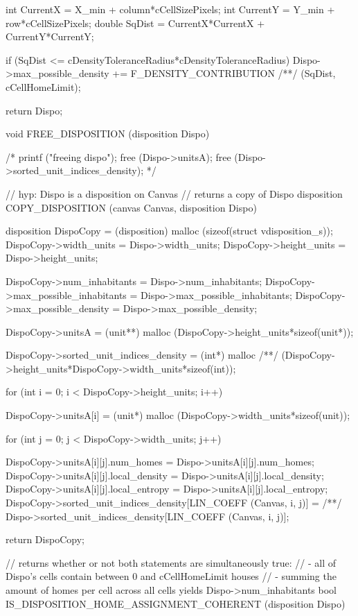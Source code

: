 \begin{C}
{{{			int CurrentX = X_min + column*cCellSizePixels;
			int CurrentY = Y_min + row*cCellSizePixels;
			double SqDist = CurrentX*CurrentX + CurrentY*CurrentY;
			
			if (SqDist <= cDensityToleranceRadius*cDensityToleranceRadius){
				Dispo->max_possible_density += F_DENSITY_CONTRIBUTION
				/**/ (SqDist, cCellHomeLimit);
			}
		}
	}
	return Dispo;
}



void FREE_DISPOSITION (disposition Dispo){
	
	/* printf ("freeing dispo\n");
	free (Dispo->unitsA);
	free (Dispo->sorted_unit_indices_density); */
}


// hyp: Dispo is a disposition on Canvas
// returns a copy of Dispo
disposition COPY_DISPOSITION (canvas Canvas, disposition Dispo){
	
	disposition DispoCopy = (disposition) malloc (sizeof(struct vdisposition_s));
	DispoCopy->width_units = Dispo->width_units;
	DispoCopy->height_units = Dispo->height_units;
	
	DispoCopy->num_inhabitants = Dispo->num_inhabitants;
	DispoCopy->max_possible_inhabitants = Dispo->max_possible_inhabitants;
	DispoCopy->max_possible_density = Dispo->max_possible_density;
	
	DispoCopy->unitsA = (unit**) malloc (DispoCopy->height_units*sizeof(unit*));
	
	DispoCopy->sorted_unit_indices_density = (int*) malloc
	/**/ (DispoCopy->height_units*DispoCopy->width_units*sizeof(int));
	
	for (int i = 0; i < DispoCopy->height_units; i++){
		
		DispoCopy->unitsA[i] = (unit*) malloc (DispoCopy->width_units*sizeof(unit));
		
		for (int j = 0; j < DispoCopy->width_units; j++){
			
			DispoCopy->unitsA[i][j].num_homes = Dispo->unitsA[i][j].num_homes;
			DispoCopy->unitsA[i][j].local_density = Dispo->unitsA[i][j].local_density;
			DispoCopy->unitsA[i][j].local_entropy = Dispo->unitsA[i][j].local_entropy;
			DispoCopy->sorted_unit_indices_density[LIN_COEFF (Canvas, i, j)] =
			/**/ Dispo->sorted_unit_indices_density[LIN_COEFF (Canvas, i, j)];
		}
	}
	return DispoCopy;
}


// returns whether or not both statements are simultaneously true:
// - all of Dispo's cells contain between 0 and cCellHomeLimit houses
// - summing the amount of homes per cell across all cells yields Dispo->num_inhabitants
bool IS_DISPOSITION_HOME_ASSIGNMENT_COHERENT (disposition Dispo){
	
}
\end{C}
